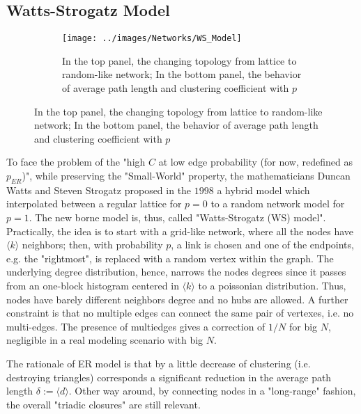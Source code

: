 \documentclass[a4paper,10pt,twoside]{book} %
\theoremstyle{definition}
\begin{document}
\subsection{Watts-Strogatz Model}
\label{sec:WS_Model}
\begin{figure}[ht]
    \begin{subfigure}{\textwidth}
        \texttt{[image: ../images/Networks/WS\_Model]}
        \centering
        \caption{In the top panel, the changing topology from lattice to random-like network; In the bottom panel, the behavior of average path length and clustering coefficient with $p$ \cite{Olaf:2011_NonRandomBrain}}
        \label{fig:WSmodel}
    \end{subfigure}
\end{figure}

To face the problem of the "high $C$ at low edge probability (for now, redefined as $p_{ER}$)", while preserving the "Small-World" property, the mathematicians Duncan Watts and Steven Strogatz proposed in the $1998$ a hybrid model which interpolated between a regular lattice for $p = 0$ to a random network model for $p = 1$. The new borne model is, thus, called "Watts-Strogatz (WS) model".
Practically, the idea is to start with a grid-like network, where all the nodes have $\langle k \rangle$ neighbors; then, with probability $p$, a link is chosen and one of the endpoints, e.g. the "rightmost", is replaced with a random vertex within the graph. The underlying degree distribution, hence, narrows the nodes degrees since it passes from an one-block histogram centered in $\langle k \rangle$ to a poissonian distribution. Thus, nodes have barely different neighbors degree and no hubs are allowed.
A further constraint is that no multiple edges can connect the same pair of vertexes, i.e. no multi-edges. The presence of multiedges gives a correction of $1/N$ for big $N$, negligible in a real modeling scenario with big $N$.

The rationale of ER model is that by a little decrease of clustering (i.e. destroying triangles) corresponds a significant reduction in the average path length $\delta:= \langle d \rangle$. Other way around, by connecting nodes in a "long-range" fashion, the overall "triadic closures" are still relevant. 
\end{document}
